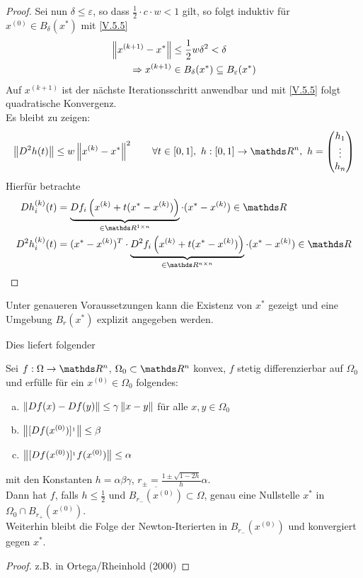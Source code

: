 \begin{proof}
  Sei nun $\delta \leq \varepsilon$, so dass $\frac{1}{2} \cdot c\cdot w <1$ gilt,
  so folgt induktiv für $x^{(0)}\in B_\delta(x^{*})$ mit \eqref{V.5.5}
  \begin{align*}
    \left\| x^{(k+1)}-x^{*} \right\| &\leq \frac{1}{2}w\delta^2 < \delta\\
    \Rightarrow x^{(k+1)}&\in B_\delta(x^{*})\subseteq B_\varepsilon(x^{*})
  \end{align*}
  Auf $x^{(k+1)} $ ist der nächste Iterationsschritt anwendbar
  und mit \eqref{V.5.5} folgt quadratische Konvergenz.\\
  Es bleibt zu zeigen:
  \begin{gather*}
    \nn{D^2h(t)} \leq w\nn{x^{(k)}-x^{*}}^2 \qquad \forall t\in [0,1],~
    h:[0,1]\rightarrow\Ren,~ h=\begin{pmatrix} h_1 \\ \vdots \\ h_n \end{pmatrix}
  \end{gather*}
  Hierfür betrachte
  \begin{align*}
    Dh_i^{(k)}(t)&=\underbrace{Df_i\left( x^{(k)}+t(x^{*}-x^{(k)})\right)}_{\in \R^{1\times n}}
                   \cdot (x^{*}-x^{(k)})\in\R\\
    D^2h_i^{(k)}(t)&=(x^{*}-x^{(k)})^T\cdot
                     \underbrace{D^2f_i\left( x^{(k)}+t(x^{*}-x^{(k)})\right)}_{\in \R^{n\times n}}
                     \cdot (x^{*}-x^{(k)})\in\R\\
  \end{align*}
\end{proof}

Unter genaueren Voraussetzungen kann die Existenz von $x^{*}$ gezeigt 
und eine Umgebung $B_r(x^{*})$ explizit angegeben werden.

Dies liefert folgender
\begin{satz}
  Sei $f:\Omega\rightarrow \Ren$, $\Omega_0 \subset \Ren$ konvex,
  $f$ stetig differenzierbar auf $\Omega_0$ und 
  erfülle für ein $x^{(0)}\in \Omega_0$ folgendes:
  \begin{enumerate}[a)]
  \item $\left\| Df(x) -Df(y) \right\|\leq \gamma \left\| x-y \right\|$ für alle $x,y\in \Omega_0$
  \item $\left\| [Df(x^{(0)})]^{_1} \right\| \leq \beta$
  \item $\left\| [Df(x^{(0)})]^{_1}f(x^{(0)}) \right\| \leq \alpha$
  \end{enumerate}
  mit den Konstanten $h=\alpha\beta\gamma$, $r_\pm = \frac{1\pm \sqrt{1-2h}}{h}\alpha$.\\
  Dann hat $f$, falls $h\leq \frac{1}{2}$ und $\overline{B_{r_{-}}(x^{(0)})}\subset \Omega$,
  genau eine Nullstelle $x^{*}$ in $\Omega_0\cap B_{r_+}(x^{(0)})$.\\
  Weiterhin bleibt die Folge der Newton-Iterierten in $B_{r_{-}}(x^{(0)})$
  und konvergiert gegen $x^{*}$.
  \begin{proof}
    z.B. in Ortega/Rheinhold (2000)
  \end{proof}
\end{satz}


